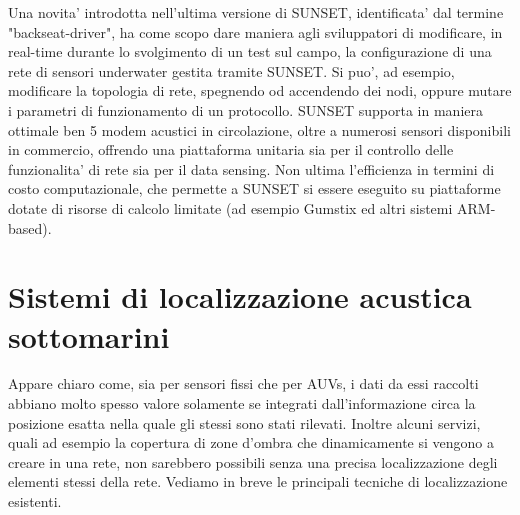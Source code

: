 \documentclass[Lau,binding=0.6cm]{sapthesis}
\begin{document}
Una novita' introdotta nell'ultima versione di SUNSET, identificata' dal termine "backseat-driver", ha come scopo dare maniera agli sviluppatori di modificare, in real-time durante lo svolgimento di un test sul campo, la configurazione di una rete di sensori underwater gestita tramite SUNSET. Si puo', ad esempio, modificare la topologia di rete, spegnendo od accendendo dei nodi, oppure mutare i parametri di funzionamento di un protocollo.
\newline
SUNSET supporta in maniera ottimale ben 5 modem acustici in circolazione, oltre a numerosi sensori disponibili in commercio, offrendo una piattaforma unitaria sia per il controllo delle funzionalita' di rete sia per il data sensing. Non ultima l'efficienza in termini di costo computazionale, che permette a SUNSET si essere eseguito su piattaforme dotate di risorse di calcolo limitate (ad esempio Gumstix ed altri sistemi ARM-based).


\section{Sistemi di localizzazione acustica sottomarini}
Appare chiaro come, sia per sensori fissi che per AUVs, i dati da essi raccolti abbiano molto spesso valore solamente se integrati dall'informazione circa la posizione esatta nella quale gli stessi sono stati rilevati. Inoltre alcuni servizi, quali ad esempio la copertura di zone d'ombra che dinamicamente si vengono a creare in una rete, non sarebbero possibili senza una precisa localizzazione degli elementi stessi della rete.
Vediamo in breve le principali tecniche di localizzazione esistenti.
\end{document}
